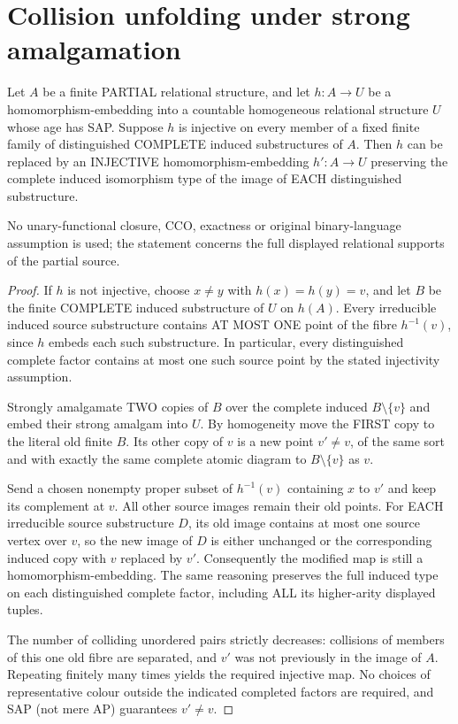 \section{Collision unfolding under strong amalgamation}
\label{sec:foundational-collision-unfolding}

\begin{lemma}\label{lem:collision-unfolding}
Let $A$ be a finite PARTIAL relational structure, and let
$h:A\to U$ be a homomorphism-embedding into a countable homogeneous
relational structure $U$ whose age has SAP. Suppose $h$ is
injective on every member of a fixed finite family of
distinguished COMPLETE induced substructures of $A$.
Then $h$ can be replaced by an INJECTIVE homomorphism-embedding
$h':A\to U$ preserving the complete induced isomorphism type
of the image of EACH distinguished substructure.

No unary-functional closure, CCO, exactness or original
binary-language assumption is used; the statement concerns
the full displayed relational supports of the partial source.
\end{lemma}
\begin{proof}
If $h$ is not injective, choose $x\ne y$ with $h(x)=h(y)=v$,
and let $B$ be the finite COMPLETE induced substructure of $U$
on $h(A)$. Every irreducible induced source substructure
contains AT MOST ONE point of the fibre $h^{-1}(v)$, since
$h$ embeds each such substructure. In particular, every
distinguished complete factor contains at most one such
source point by the stated injectivity assumption.

Strongly amalgamate TWO copies of $B$ over the complete
induced $B\setminus\{v\}$ and embed their strong amalgam
into $U$. By homogeneity move the FIRST copy to the
literal old finite $B$. Its other copy of $v$ is a new
point $v'\ne v$, of the same sort and with exactly the
same complete atomic diagram to $B\setminus\{v\}$ as $v$.

Send a chosen nonempty proper subset of $h^{-1}(v)$
containing $x$ to $v'$ and keep its complement at $v$.
All other source images remain their old points.
For EACH irreducible source substructure $D$, its
old image contains at most one source vertex over $v$,
so the new image of $D$ is either unchanged or the
corresponding induced copy with $v$ replaced by $v'$.
Consequently the modified map is still a
homomorphism-embedding. The same reasoning preserves
the full induced type on each distinguished complete
factor, including ALL its higher-arity displayed tuples.

The number of colliding unordered pairs strictly
decreases: collisions of members of this one old
fibre are separated, and $v'$ was not previously in
the image of $A$. Repeating finitely many times yields
the required injective map. No choices of representative
colour outside the indicated completed factors are
required, and SAP (not mere AP) guarantees $v'\ne v$.
\end{proof}
